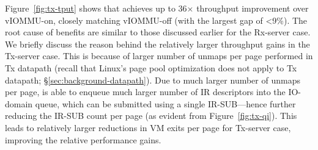 Figure~\ref{fig:tx-tput} shows that {\name} achieves up to 36$\times$ throughput improvement over vIOMMU-on,
closely matching vIOMMU-off (with the largest gap of <9\%). The root cause of {\name} benefits are similar to those discussed earlier for the Rx-server case. We briefly discuss the reason behind the relatively larger throughput gains in the Tx-server case. This is because of larger number of unmaps per page performed in Tx datapath (recall that Linux's page pool optimization does not apply to Tx datapath; \S\ref{sec:background-datapath}). Due to much larger number of unmaps per page, {\name} is able to enqueue much larger number of IR descriptors into the IO-domain queue, which can be submitted using a single IR-SUB---hence further reducing the IR-SUB count per page (as evident from Figure~\ref{fig:tx-qi}). This leads to relatively larger reductions in VM exits per page for Tx-server case, improving the relative performance gains.










